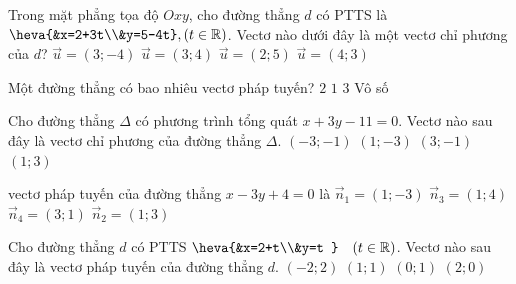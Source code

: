 \begin{ex}%
	Trong mặt phẳng tọa độ $Oxy$, cho đường thẳng $d$ có PTTS là $\heva{&x=2+3t\\&y=5-4t},(t\in\mathbb{R})$. Vectơ nào dưới đây là một vectơ chỉ phương của $d$?
	\choice
	{\True $\overrightarrow{u}=(3;-4)$}
	{$\overrightarrow{u}=(3;4)$}
	{$\overrightarrow{u}=(2;5)$}
	{$\overrightarrow{u}=(4;3)$}
\end{ex}


\begin{ex}%
	Một đường thẳng có bao nhiêu vectơ pháp tuyến?
	\choice
	{$ 2 $}
	{$ 1 $}
	{$ 3 $}
	{\True Vô số}
\end{ex}


\begin{ex}%
	Cho đường thẳng $\Delta$ có phương trình tổng quát $x+3y-11=0$. Vectơ nào sau đây là vectơ chỉ phương của đường thẳng $\Delta$.
	\choice
	{$(-3;-1)$}
	{$(1;-3)$}
	{\True $(3;-1)$}
	{$(1;3)$}
\end{ex}


\begin{ex}%
	vectơ pháp tuyến của đường thẳng $x-3y+4=0$ là
	\choice
	{\True $\overrightarrow{n}_1=\left(1;-3\right)$}
	{$\overrightarrow{n}_3=\left(1;4\right)$}
	{$\overrightarrow{n}_4=\left(3;1\right)$}
	{$\overrightarrow{n}_2=\left(1;3\right)$}
\end{ex}


\begin{ex}%
	Cho đường thẳng $d$ có PTTS $\heva{&x=2+t\\&y=t }\quad (t\in \mathbb{R})$. Vectơ nào sau đây là vectơ pháp tuyến của đường thẳng $d$.
	\choice
	{\True $(-2;2)$}
	{$(1;1)$}
	{$(0;1)$}
	{$(2;0)$}
\end{ex}


